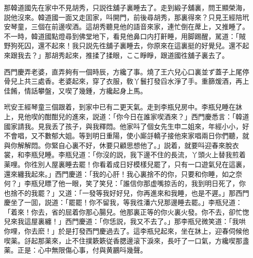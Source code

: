 那韓道國先在家中不見胡秀，只説徃舖子裏睡去了。走到緞子舖裏，問王顯榮海，説他沒來。韓道國一面又走囬家，呌開門，前後尋胡秀，那裏得來？只見王經陪玳安琴童，三個在前邊喫酒。這胡秀聽見他的語音來家，連忙倒在蓆上，又推睡了。不一時，韓道國點燈尋到佛堂地下，看見他鼻口内打鼾睡，用脚踢醒，駡道：「賊野狗死囚，還不起來！我只説先徃舖子裏睡去，你原來在這裏挺的好覺兒。還不起來跟我去？」那胡秀起來，推揉了揉眼，ここ睜睜，跟道國徃舖子裏去了。

西門慶弄老婆，直弄夠有一個時辰，方纔了事。燒了王六兒心口裏並ず蓋子上尾停骨兒上共三處香。老婆起來，穿了衣服，敎丫鬟打發舀水淨了手。重篩煖酒，再上佳餚，情話攀盤，又喫了幾鍾，方纔起身上馬。

玳安王經琴童三個跟着，到家中已有二更天氣。走到李瓶兒房中。李瓶兒睡在牀上，見他喫的酣酣兒的進來，説道：「你今日在誰家喫酒來？」西門慶悉言：「韓道國家請我。見我丢了孩子，與我釋悶。他家呌了個女先生申二姐來，年經小小，好不會唱，又不數郁大姐。等到明日重陽，使小廝㧱轎子接他來家唱兩日你們聽，就與你解解悶。你緊自心裏不好，休要只顧思想他了。」説着，就要呌迎春來脫衣裳，和李瓶兒睡。李瓶兒道：「你沒的説，我下邊不住的長流，丫頭火上替我煎着薬哩。你徃別人屋裏睡去罷！你看着成日好模樣兒罷了，只有一口遊氣兒在這裏，還來纏我起來。」西門慶道：「我的心肝！我心裏捨不的你，只要和你睡，如之奈何？」李瓶兒瞟了他一眼，笑了笑兒：「誰信你那虚嘴掠舌的，我到明日死了，你也捨不的我罷？」又道：「一發等我好好兒，你再進來和我睡，也是不遲。」那西門慶坐了一囬，説道：「罷罷！你不留我，等我徃潘六兒那邊睡去罷。」李瓶兒道：「着來！你去，省的屈着你那心腸兒。他那裏正等的你火裏火發。你不去，卻忙愡兒來我這屋裏纏！」西門慶道：「你恁説，我又不去了。」那李瓶兒微笑道：「我哄你哩，你去麽！」於是打發西門慶過去了。這李瓶兒起來，坐在牀上，迎春伺候他喫薬。㧱起那薬來，止不住撲簌簌従香腮邊滚下淚來，長吁了一口氣，方纔喫那盞薬。正是：心中無限傷心事，付與黄鸝呌幾聲。

